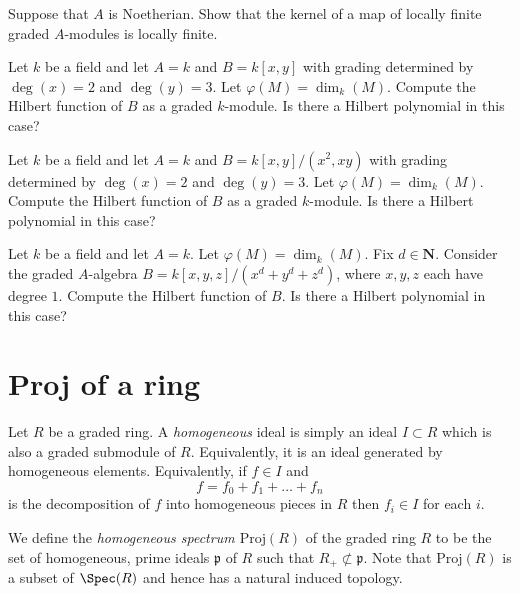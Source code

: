 \begin{exercise}
\label{exercise-kernel-locally-finite}
Suppose that $A$ is Noetherian. Show that the kernel of a map
of locally finite graded $A$-modules is locally finite.
\end{exercise}

\begin{exercise}
\label{exercise-no-hilbert}
Let $k$ be a field and let $A = k$ and $B = k[x, y]$ with grading
determined by $\deg(x) = 2$ and $\deg(y) = 3$. Let $\varphi(M) = \dim_k(M)$.
Compute the Hilbert function of $B$ as a graded $k$-module. Is there
a Hilbert polynomial in this case?
\end{exercise}

\begin{exercise}
\label{exercise-no-hilbert-or-is-there}
Let $k$ be a field and let $A = k$ and $B = k[x, y]/(x^2, xy)$ with grading
determined by $\deg(x) = 2$ and $\deg(y) = 3$. Let $\varphi(M) = \dim_k(M)$.
Compute the Hilbert function of $B$ as a graded $k$-module. Is there
a Hilbert polynomial in this case?
\end{exercise}

\begin{exercise}
\label{exercise-hilbert-to-compute}
Let $k$ be a field and let $A = k$.  Let $\varphi(M) = \dim_k(M)$.
Fix $d\in {\mathbf N}$. Consider the graded $A$-algebra
$B = k[x, y, z]/(x^d + y^d + z^d)$, where  $x, y, z$ each have degree $1$.
Compute the Hilbert function of $B$. Is there a Hilbert polynomial
in this case?
\end{exercise}



\section{Proj of a ring}
\label{section-proj-ring}

\begin{definition}
\label{definition-homogeneous-ideal}
Let $R$ be a graded ring. A {\it homogeneous} ideal is simply an ideal
$I \subset R$ which is also a graded submodule of $R$. Equivalently,
it is an ideal generated by homogeneous elements. Equivalently, if
$f \in I$ and
$$
f = f_0 + f_1 + \ldots + f_n
$$
is the decomposition of $f$ into homogeneous pieces in $R$ then $f_i \in I$
for each $i$.
\end{definition}

\begin{definition}
\label{definition-Proj-R}
We define the {\it homogeneous spectrum $\text{Proj}(R)$}
of the graded ring $R$ to be the set of homogeneous, prime ideals
${\mathfrak p}$ of $R$ such that $R_{+} \not \subset {\mathfrak p}$.
Note that $\text{Proj}(R)$ is a subset of $\Spec(R)$ and hence has a
natural induced topology.
\end{definition}

